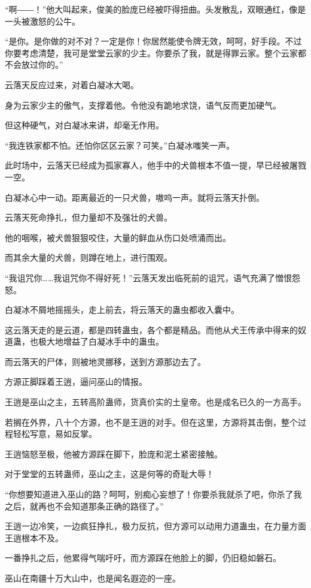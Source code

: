 \begin{this_body}
“啊――！”他大叫起来，俊美的脸庞已经被吓得扭曲。头发散乱，双眼通红，像是一头被激怒的公牛。

“是你。是你做的对不对？一定是你！你居然能使令牌无效，呵呵，好手段。不过你要考虑清楚，我可是堂堂云家的少主。你要杀了我，就是得罪云家。整个云家都不会放过你的。”

云落天反应过来，对着白凝冰大喝。

身为云家少主的傲气，支撑着他。令他没有跪地求饶，语气反而更加硬气。

但这种硬气，对白凝冰来讲，却毫无作用。

“我连铁家都不怕。还怕你区区云家？可笑。”白凝冰嗤笑一声。

此时场中，云落天已经成为孤家寡人，他手中的犬兽根本不值一提，早已经被屠戮一空。

白凝冰心中一动。距离最近的一只犬兽，嗷呜一声。就将云落天扑倒。

云落天死命挣扎，但力量却不及强壮的犬兽。

他的咽喉，被犬兽狠狠咬住，大量的鲜血从伤口处喷涌而出。

而其余大量的犬兽，则蹲在地上，进行围观。

“我诅咒你……我诅咒你不得好死！”云落天发出临死前的诅咒，语气充满了憎恨怨怒。

白凝冰不屑地摇摇头，走上前去，将云落天的蛊虫都收入囊中。

这云落天走的是云道，都是四转蛊虫，各个都是精品。而他从犬王传承中得来的奴道蛊，也极大地增益了白凝冰手中的蛊虫。

而云落天的尸体，则被地灵挪移，送到方源那边去了。

方源正脚踩着王逍，逼问巫山的情报。

王逍是巫山之主，五转高阶蛊师，货真价实的土皇帝。也是成名已久的一方高手。

若搁在外界，八十个方源，也不是王逍的对手。但在这里，方源将其击倒，整个过程轻松写意，易如反掌。

王逍恼怒至极，他被方源踩在脚下，脸庞和泥土紧密接触。

对于堂堂的五转蛊师，巫山之主，这是何等的奇耻大辱！

“你想要知道进入巫山的路？呵呵，别痴心妄想了！你要杀我就杀了吧，你杀了我之后，就再也不会知道那条正确的路径了。”

王逍一边冷笑，一边疯狂挣扎，极力反抗，但方源可以动用力道蛊虫，在力量方面王逍根本不及。

一番挣扎之后，他累得气喘吁吁，而方源踩在他脸上的脚，仍旧稳如磐石。

巫山在南疆十万大山中，也是闻名遐迩的一座。


\end{this_body}
